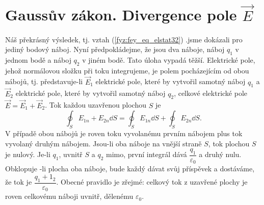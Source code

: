     \begin{figure}[ht!]
      \centering
      \hspace{0.1\textwidth}
      \caption{ }       
    \end{figure}

  \section{Gaussův zákon. Divergence pole \texorpdfstring{\(\vec{E}\)}{E}}    
    \cite[s.~75]{Feynman02} Náš překrásný výsledek, tj. vztah (\ref{fyz:fey_eq_elstat32}) .jsme 
    dokázali pro jediný bodový náboj. Nyní předpokládejme, že jsou dva náboje, náboj \(q_1\) v 
    jednom bodě a náboj \(q_2\) v jiném bodě. Tato úloha vypadá těžší. Elektrické pole, jehož 
    normálovou složku při toku integrujeme, je polem pocházejícím od obou nábojů, tj. představuje-li 
    \(\vec{E}_1\) elektrické pole, které by vytvořil samotný náboj \(q_1\) a \(\vec{E}_2\) 
    elektrické pole, které by vytvořil samotný náboj \(q_2\), celkové elektrické pole 
    \(\vec{E}=\vec{E}_1 + \vec{E}_2\). Tok každou uzavřenou plochou \(S\) je
    \begin{equation}\label{fyz:fey_eq_elstat33}
     \oint_S E_{1n} + E_{2n}\dd{S} = \oint_S E_{1n}\dd{S} + \oint_S E_{2n}\dd{S}.
    \end{equation}
    V případě obou nábojů je roven toku vyvolanému prvním nábojem plus tok vyvolaný druhým nábojem. 
    Jsou-li oba náboje na vnější straně \(S\), tok plochou \(S\) je nulový. Je-li \(q_1\), uvnitř 
    \(S\) a \(q_2\) mimo, první integrál dává \(\dfrac{q_1}{\varepsilon_0}\) a druhý nulu. Obklopuje 
    -li plocha oba náboje, bude každý dávat svůj příspěvek a dostáváme, že tok je 
    \(\dfrac{q_1+1_2}{\varepsilon_0}\). Obecné pravidlo je zřejmé: celkový tok z uzavřené plochy je 
    roven celkovému náboji uvnitř, dělenému \(\varepsilon_0\).
    
